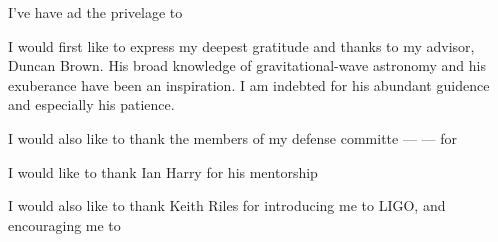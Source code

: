 I've have ad the privelage to 

\noindent I would first like to express my deepest gratitude and thanks to my advisor,
Duncan Brown. His broad knowledge of gravitational-wave astronomy and his
exuberance have been an inspiration. I am indebted for his abundant guidence and
especially his patience.

\noindent I would also like to thank the members of my defense committe --- 
--- for 

\noindent I would like to thank Ian Harry for his mentorship

\noindent I would also like to thank Keith Riles for introducing me to LIGO,
and encouraging me to 
 
